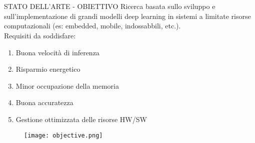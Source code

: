 \section{}

\begin{frame}{STATO DELL'ARTE - OBIETTIVO}
    Ricerca basata sullo sviluppo e sull'implementazione di grandi modelli deep learning in sistemi a 
    limitate risorse computazionali (es: embedded, mobile, indossabbili, etc.).\\
    Requisiti da soddisfare:\\
    \hspace{1cm}
    \begin{minipage}{\linewidth}
        \centering
        \begin{minipage}{0.45\linewidth}
            \begin{enumerate}
                \item Buona velocità di inferenza
                \item Risparmio energetico
                \item Minor occupazione della memoria
                \item Buona accuratezza
                \item Gestione ottimizzata delle risorse HW/SW
            \end{enumerate}
        \end{minipage}
        \begin{minipage}{0.45\linewidth}
            \begin{figure}
                \centering
                \texttt{[image: objective.png]}
                \centering
            \end{figure}
        \end{minipage}
    \end{minipage}
\end{frame}